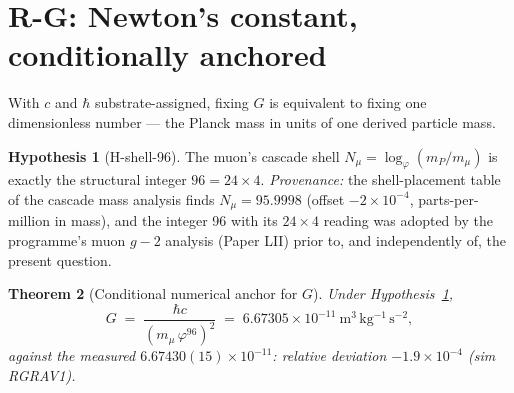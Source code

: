 \documentclass[12pt]{article}
\newtheorem{theorem}{Theorem}
\theoremstyle{definition}
\newtheorem{hypothesis}[theorem]{Hypothesis}
\theoremstyle{remark}
\begin{document}
\section{R-G: Newton's constant, conditionally anchored}\label{sec:G}

With $c$ and $\hbar$ substrate-assigned, fixing $G$ is equivalent to fixing one dimensionless number --- the Planck mass in units of one derived particle mass.

\begin{hypothesis}[H-shell-96]\label{hyp:shell}
The muon's cascade shell $N_\mu = \log_\varphi(m_P/m_\mu)$ is exactly the structural integer $96 = 24\times4$. \emph{Provenance:} the shell-placement table of the cascade mass analysis finds $N_\mu = 95.9998$ (offset $-2\times10^{-4}$, parts-per-million in mass), and the integer 96 with its $24\times4$ reading was adopted by the programme's muon $g{-}2$ analysis (Paper LII) prior to, and independently of, the present question.
\end{hypothesis}

\begin{theorem}[Conditional numerical anchor for $G$]\label{thm:G}
Under Hypothesis~\ref{hyp:shell},
$$G \;=\; \frac{\hbar c}{(m_\mu\,\varphi^{96})^2} \;=\; 6.67305\times10^{-11}\ \mathrm{m^3\,kg^{-1}\,s^{-2}},$$
against the measured $6.67430(15)\times10^{-11}$: relative deviation $-1.9\times10^{-4}$ (sim RGRAV1).
\end{theorem}
\end{document}
